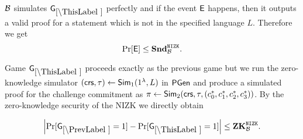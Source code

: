 $\mathcal{B}$ simulates $\games_\thisgame$ perfectly and if the event $\mathsf{E}$ happens, then it outputs a valid proof for a statement which is not in the specified language $L$. Therefore we get
\[\Pr[\mathsf{E}] \leq \mathbf{Snd}^{\mathtt{NIZK}}_{\mathcal{B}}.\]





Game $\games_\thisgame$ proceeds exactly as the previous game but we run the zero-knowledge simulator $(\mathsf{crs}, \tau) \leftarrow \mathsf{Sim}_1(1{^{\lambda}}, L)$ in $\mathsf{PGen}$ and produce a simulated proof for the challenge commitment as $\pi \leftarrow \mathsf{Sim}_2(\mathsf{crs}, \tau, (c_0^*,c_1^*,c_2^*,c_3^*))$. By the zero-knowledge security of the NIZK we directly obtain
\begin{lemma}
\[
\left|\Pr[\games_\prevgame = 1] - \Pr[\games_\thisgame = 1]\right| \leq \zk^\nizk_\advB.
\]
\end{lemma}

